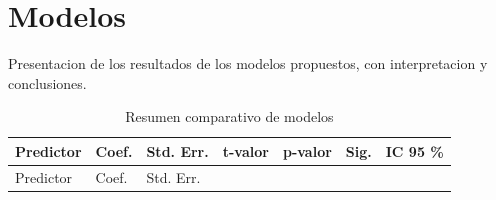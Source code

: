 \documentclass[
  spanish,
  a4paper,
  oneside]{scrbook}
\begin{document}
\section{Modelos}\label{modelos}

Presentacion de los resultados de los modelos propuestos, con
interpretacion y conclusiones.

\begin{longtable}[]{@{}
  >{\raggedright\arraybackslash}p{}
  >{\centering\arraybackslash}p{}
  >{\centering\arraybackslash}p{}
  >{\centering\arraybackslash}p{}
  >{\centering\arraybackslash}p{}
  >{\centering\arraybackslash}p{}
  >{\centering\arraybackslash}p{}@{}}
\caption{Resumen comparativo de modelos}\tabularnewline
\toprule\noalign{}
\begin{minipage}[b]{\linewidth}\raggedright
Predictor
\end{minipage} & \begin{minipage}[b]{\linewidth}\centering
Coef.
\end{minipage} & \begin{minipage}[b]{\linewidth}\centering
Std. Err.
\end{minipage} & \begin{minipage}[b]{\linewidth}\centering
t-valor
\end{minipage} & \begin{minipage}[b]{\linewidth}\centering
p-valor
\end{minipage} & \begin{minipage}[b]{\linewidth}\centering
Sig.
\end{minipage} & \begin{minipage}[b]{\linewidth}\centering
IC 95 \%
\end{minipage} \\
\midrule\noalign{}
\endfirsthead
\toprule\noalign{}
\begin{minipage}[b]{\linewidth}\raggedright
Predictor
\end{minipage} & \begin{minipage}[b]{\linewidth}\centering
Coef.
\end{minipage} & \begin{minipage}[b]{\linewidth}\centering
Std. Err.
\end{minipage} & \begin{minipage}[b]{\linewidth}\centering

\end{minipage}
\end{longtable}
\end{document}
